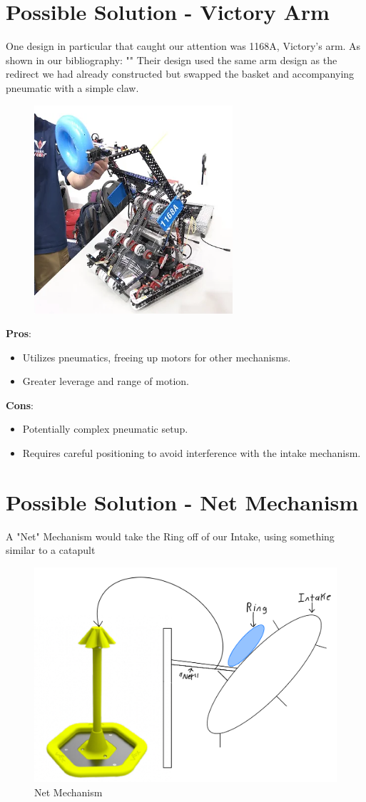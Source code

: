 \section*{Possible Solution - Victory Arm}
One design in particular that caught our attention was 1168A, Victory’s arm. As shown in our bibliography: "\cite{1168APitsandParts}"
Their design used the same arm design as the redirect we had already constructed but swapped the basket and accompanying pneumatic with a simple claw.
\begin{figure}[H]
    \centering
    \includegraphics[width=0.5\linewidth]{images/Victory Arm Pits and Parts Thumbnail.png}
    \caption{\cite{1168APitsandParts}}
    \label{fig:1168A}
\end{figure}

\noindent
\textbf{Pros}:
\begin{itemize}
    \item Utilizes pneumatics, freeing up motors for other mechanisms.
    \item Greater leverage and range of motion.
\end{itemize}
\textbf{Cons}:
\begin{itemize}
    \item Potentially complex pneumatic setup.
    \item Requires careful positioning to avoid interference with the intake mechanism.
\end{itemize}

\section*{Possible Solution - Net Mechanism}
A "Net" Mechanism would take the Ring off of our Intake, using something similar to a catapult 

\begin{figure}[H]
    \centering
    \includegraphics[width=0.5\linewidth]{images/Fishmech.jpg}
    \caption{Net Mechanism}
    \label{fig:fish-mech}
\end{figure}


